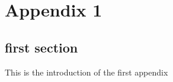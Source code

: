 \chapter{Appendix 1}
\label{appendix}

\section{first section}
This is the introduction of the first appendix
